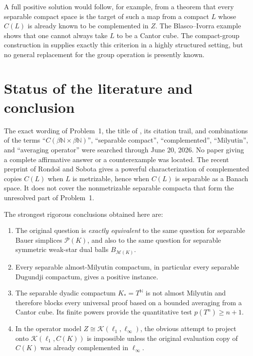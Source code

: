 \documentclass[11pt]{article}
\theoremstyle{definition}
\theoremstyle{remark}
\newcommand{\C}{C}
\newcommand{\Pp}{\mathcal P}
\newcommand{\M}{\mathcal M}
\newcommand{\Kop}{\mathcal K}
\begin{document}
A full positive solution would follow, for example, from a theorem that
every separable compact space is the target of such a map from a compact
$L$ whose $\C(L)$ is already known to be complemented in $Z$.  The
Blasco--Ivorra example shows that one cannot always take $L$ to be a Cantor
cube.  The compact-group construction in \cite{PRS26} supplies exactly this
criterion in a highly structured setting, but no general replacement for
the group operation is presently known.

\section{Status of the literature and conclusion}

The exact wording of Problem~1, the title of \cite{PRS26}, its citation
trail, and combinations of the terms
``$\C(\beta\mathbb N\times\beta\mathbb N)$'', ``separable compact'',
``complemented'', ``Milyutin'', and ``averaging operator'' were searched
through June 20, 2026.  No paper giving a complete affirmative answer or a
counterexample was located.  The recent preprint of Rondo\v{s} and Sobota
\cite{RS26} gives a powerful characterization of complemented copies
$\C(L)$ when $L$ is metrizable, hence when $\C(L)$ is separable as a Banach
space.  It does not cover the nonmetrizable separable compacta that form the
unresolved part of Problem~1.

The strongest rigorous conclusions obtained here are:
\begin{enumerate}[label=\arabic*.]
\item The original question is \emph{exactly equivalent} to the same
      question for separable Bauer simplices $\Pp(K)$, and also to the same
      question for separable symmetric weak-star dual balls
      $B_{\M(K)}$.
\item Every separable almost-Milyutin compactum, in particular every
      separable Dugundji compactum, gives a positive instance.
\item The separable dyadic compactum $K_*=T^{\mathbb N}$ is not almost
      Milyutin and therefore blocks every universal proof based on a
      bounded averaging from a Cantor cube.  Its finite powers provide the
      quantitative test $p(T^n)\geq n+1$.
\item In the operator model
      $Z\cong\Kop(\ell_1,\ell_\infty)$, the obvious attempt to project onto
      $\Kop(\ell_1,\C(K))$ is impossible unless the original evaluation
      copy of $\C(K)$ was already complemented in $\ell_\infty$.
\end{enumerate}
\end{document}
